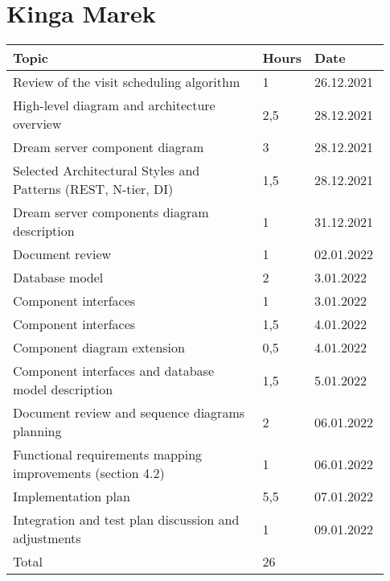 \section*{Kinga Marek}
\begin{longtable}{@{}p{0.67\linewidth} p{0.06\linewidth} p{0.20\linewidth}@{}}
    \toprule[1.5pt]
    Topic &  Hours & Date \\ \hline
    Review of the visit scheduling algorithm & 1 & 26.12.2021\\
    High-level diagram and architecture overview & 2,5 &28.12.2021\\
    Dream server component diagram & 3 & 28.12.2021 \\
    Selected Architectural Styles and Patterns (REST, N-tier, DI) & 1,5 & 28.12.2021 \\
    Dream server components diagram description & 1 & 31.12.2021 \\
    Document review & 1 & 02.01.2022\\
    Database model & 2 & 3.01.2022 \\
    Component interfaces & 1 & 3.01.2022 \\
    Component interfaces & 1,5 & 4.01.2022 \\
    Component diagram extension & 0,5 & 4.01.2022 \\
    Component interfaces and database model description & 1,5 & 5.01.2022 \\
    Document review and sequence diagrams planning & 2 & 06.01.2022\\
    Functional requirements mapping improvements (section 4.2) & 1 & 06.01.2022\\
    Implementation plan & 5,5 & 07.01.2022\\
    Integration and test plan discussion and adjustments & 1 & 09.01.2022\\
    \hline
    Total & 26 & \\ 
    \bottomrule[1.5pt]
\end{longtable}